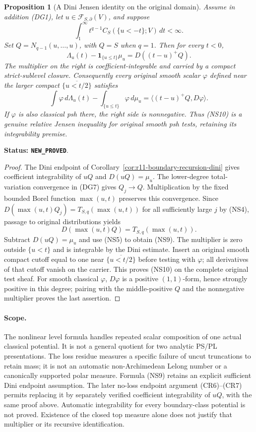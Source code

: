 \documentclass[11pt,a4paper]{article}
\numberwithin{equation}{section}
\newtheorem{proposition}[theorem]{Proposition}
\theoremstyle{definition}
\theoremstyle{remark}
\begin{document}
\begin{proposition}[A Dini Jensen identity on the original domain]
\label{prop:r11-Dini-Jensen}
Assume in addition (DG1), let
$u\in\mathcal F_{S,\partial}(V)$, and suppose
\[
                \int_1^\infty t^{q-1}
                              C_S(\{u<-t\};V)\,dt<\infty.
\]
Set $Q=N_{q-1}(u,\ldots,u)$, with $Q=S$ when $q=1$.
Then for every $t<0$,
\[
 \Lambda_u(t)-\mathbf1_{\{u\leq t\}}\mu_u
                         =D((t-u)^+Q).
 \tag{NS9}
\]
The multiplier on the right is coefficient-integrable and
carried by a compact strict-sublevel closure. Consequently every
original smooth scalar $\varphi$ defined near the larger compact
$\overline{\{u<t/2\}}$ satisfies
\[
 \int\varphi\,d\Lambda_u(t)
       -\int_{\{u\leq t\}}\varphi\,d\mu_u
                         =\langle(t-u)^+Q,D\varphi\rangle.
 \tag{NS10}
\]
If $\varphi$ is also classical psh there, the right side is
nonnegative. Thus (NS10) is a genuine relative Jensen inequality
for original smooth psh tests, retaining its integrability premise.
\end{proposition}

\noindent\textbf{Status: \texttt{NEW\_PROVED}}.

\begin{proof}
The Dini endpoint of Corollary~\ref{cor:r11-boundary-recursion-dini}
gives coefficient integrability of $uQ$ and $D(uQ)=\mu_u$.
The lower-degree total-variation convergence in (DG7) gives
$Q_j\to Q$. Multiplication by the fixed bounded Borel function
$\max(u,t)$ preserves this convergence. Since
$D(\max(u,t)Q_j)=T_{S,q}(\max(u,t))$ for all sufficiently large
$j$ by (NS4), passage to original distributions yields
\[
                    D(\max(u,t)Q)=T_{S,q}(\max(u,t)).
\]
Subtract $D(uQ)=\mu_u$ and use (NS5) to obtain (NS9).
The multiplier is zero outside $\{u<t\}$ and is integrable by
the Dini estimate. Insert an original smooth compact cutoff
equal to one near $\overline{\{u<t/2\}}$ before testing with
$\varphi$; all derivatives of that cutoff vanish on the carrier.
This proves (NS10) on the complete original test sheaf.
For smooth classical $\varphi$, $D\varphi$ is a positive
$(1,1)$-form, hence strongly positive in this degree; pairing
with the middle-positive $Q$ and the nonnegative multiplier
proves the last assertion.
\end{proof}

\paragraph{Scope.}
The nonlinear level formula handles repeated scalar composition of
one actual classical potential. It is not a general quotient for
two analytic PS/PL presentations. The loss residue measures a
specific failure of uncut truncations to retain mass; it is not an
automatic non-Archimedean Lelong number or a canonically supported
polar measure. Formula (NS9) retains an explicit sufficient Dini
endpoint assumption. The later no-loss endpoint argument
(CR6)--(CR7) permits replacing it by separately verified
coefficient integrability of $uQ$, with the same proof above.
Automatic integrability for every boundary-class potential is
not proved. Existence of the closed top measure alone does not
justify that multiplier or its recursive identification.
\end{document}
